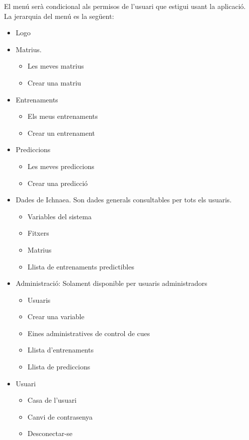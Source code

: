 \phantonsection
\label{menudessign}
El menú serà condicional als permisos de l'usuari que estigui usant la aplicació. La jerarquia del menú es la següent:
\begin{itemize}
\item Logo
\item Matrius.
 \begin{itemize}
 \item Les meves matrius
 \item Crear una matriu
  \end{itemize}
\item Entrenaments
 \begin{itemize}
 \item Els meus entrenaments
 \item Crear un entrenament
 \end{itemize} 
\item Prediccions
 \begin{itemize}
 \item Les meves prediccions
 \item Crear una predicció
 \end{itemize} 
\item Dades de Ichnaea. Son dades generals consultables per tots els usuaris.
 \begin{itemize}
 \item Variables del sistema
 \item Fitxers
 \item Matrius
 \item Llista de entrenaments predictibles
 \end{itemize} 
\item Administració: Solament disponible per usuaris administradors
\begin{itemize}
\item Usuaris
\item Crear una variable
\item Eines administratives de control de cues
\item Llista d'entrenaments
\item Llista de prediccions
\end{itemize}
\item Usuari
 \begin{itemize}
 \item Casa de l'usuari
 \item Canvi de contrasenya
 \item Desconectar-se
 \end{itemize}
\end{itemize}

